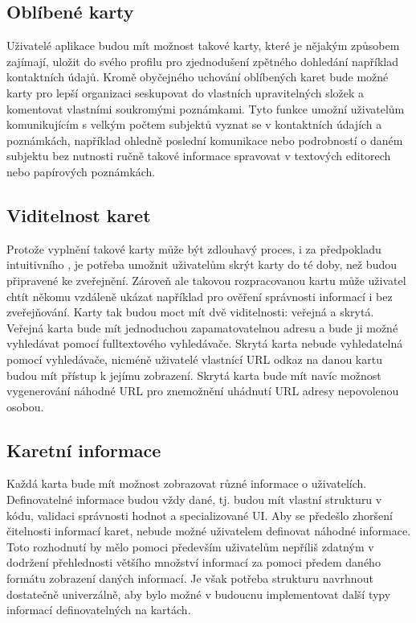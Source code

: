	\subsection{Oblíbené karty}

	Uživatelé aplikace budou mít možnost takové karty, které je nějakým způsobem zajímají, uložit do svého profilu pro
	zjednodušení zpětného dohledání například kontaktních údajů.
	Kromě obyčejného uchování oblíbených karet bude možné karty pro lepší organizaci seskupovat do vlastních upravitelných
	složek a komentovat vlastními soukromými poznámkami.
	Tyto funkce umožní uživatelům komunikujícím s velkým počtem subjektů vyznat se v kontaktních údajích a poznámkách,
	například ohledně poslední komunikace nebo podrobností o daném subjektu bez nutnosti ručně takové informace spravovat v
	textových editorech nebo papírových poznámkách.

	\subsection{Viditelnost karet}

	Protože vyplnění takové karty může být zdlouhavý proces, i za předpokladu intuitivního , je potřeba umožnit
	uživatelům skrýt karty do té doby, než budou připravené ke zveřejnění.
	Zároveň ale takovou rozpracovanou kartu může uživatel chtít někomu vzdáleně ukázat například pro ověření správnosti informací
	i bez zveřejňování.
	Karty tak budou moct mít dvě viditelnosti: veřejná a skrytá.
	Veřejná karta bude mít jednoduchou zapamatovatelnou  adresu a bude ji možné vyhledávat pomocí fulltextového vyhledávače.
	Skrytá karta nebude vyhledatelná pomocí vyhledávače, nicméně uživatelé vlastnící \ac{URL} odkaz na danou kartu budou mít přístup
	k jejímu zobrazení.
	Skrytá karta bude mít navíc možnost vygenerování náhodné \ac{URL} pro znemožnění uhádnutí \ac{URL} adresy nepovolenou osobou.

	\subsection{Karetní informace}

	Každá karta bude mít možnost zobrazovat různé informace o uživatelích.
	Definovatelné informace budou vždy dané, tj. budou mít vlastní strukturu v kódu, validaci správnosti hodnot a specializované
	\ac{UI}.
	Aby se předešlo zhoršení čitelnosti informací karet, nebude možné uživatelem definovat náhodné informace.
	Toto rozhodnutí by mělo pomoci především uživatelům nepříliš zdatným v dodržení přehlednosti většího množství
	informací za pomoci předem daného formátu zobrazení daných informací.
	Je však potřeba strukturu navrhnout dostatečně univerzálně, aby bylo možné v budoucnu implementovat další typy informací
	definovatelných na kartách.

